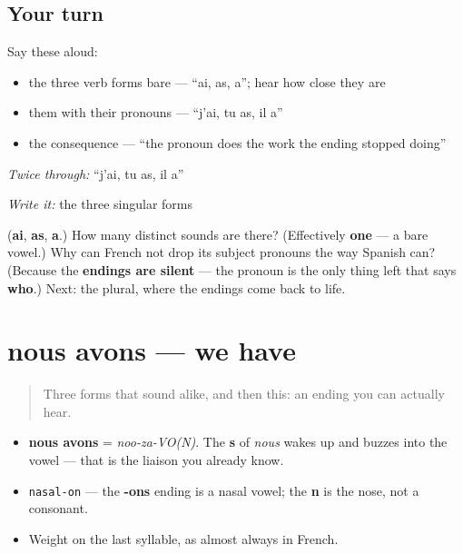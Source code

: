 \subsection*{Your turn}
Say these aloud:

\begin{itemize}
\raggedright
  \item the three verb forms bare — \textquotedblleft{}ai, as, a\textquotedblright{}; hear how close they are
  \item them with their pronouns — \textquotedblleft{}j'ai, tu as, il a\textquotedblright{}
  \item the consequence — \textquotedblleft{}the pronoun does the work the ending stopped doing\textquotedblright{}
\end{itemize}

\emph{Twice through:} \textquotedblleft{}j'ai, tu as, il a\textquotedblright{}

\begin{tcolorbox}[breakable,colback=teal!4,colframe=teal!35!black,title={Before you move on}]
\emph{Write it:} the three singular forms

(\textbf{ai}, \textbf{as}, \textbf{a}.) How many distinct sounds are there? (Effectively \textbf{one} — a bare vowel.) Why can French not drop its subject pronouns the way Spanish can? (Because the \textbf{endings are silent} — the pronoun is the only thing left that says \textbf{who}.) Next: the plural, where the endings come back to life.
\end{tcolorbox}
\section[nous avons]{nous avons — we have}

\label{lesson:FR-C14-avons}



\begin{quote}
Three forms that sound alike, and then this: an ending you can actually hear.
\end{quote}

\begin{sounds}
\begin{itemize}
\raggedright
  \item \textbf{nous avons} = \emph{noo-za-VO(N)}. The \textbf{s} of \emph{nous} wakes up and buzzes into the vowel — that is the liaison you already know.
  \item \texttt{nasal-on} — the \textbf{-ons} ending is a nasal vowel; the \textbf{n} is the nose, not a consonant.
  \item Weight on the last syllable, as almost always in French.
\end{itemize}
\end{sounds}

